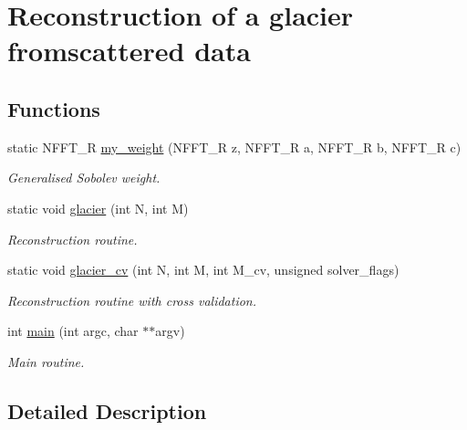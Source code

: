 \hypertarget{group__examples__solver__glacier}{\section{Reconstruction of a glacier fromscattered data}
\label{group__examples__solver__glacier}
}
\subsection*{Functions}
\begin{DoxyCompactItemize}
\item 
\hypertarget{group__examples__solver__glacier_ga9d2aeed180220c8c5c3c53b557c349f7}{static N\-F\-F\-T\-\_\-\-R \hyperlink{group__examples__solver__glacier_ga9d2aeed180220c8c5c3c53b557c349f7}{my\-\_\-weight} (N\-F\-F\-T\-\_\-\-R z, N\-F\-F\-T\-\_\-\-R a, N\-F\-F\-T\-\_\-\-R b, N\-F\-F\-T\-\_\-\-R c)}\label{group__examples__solver__glacier_ga9d2aeed180220c8c5c3c53b557c349f7}

\begin{DoxyCompactList}\small\item\em Generalised Sobolev weight. \end{DoxyCompactList}\item 
\hypertarget{group__examples__solver__glacier_gae32b7b49ac3d92c70301b2f96ab31e7a}{static void \hyperlink{group__examples__solver__glacier_gae32b7b49ac3d92c70301b2f96ab31e7a}{glacier} (int N, int M)}\label{group__examples__solver__glacier_gae32b7b49ac3d92c70301b2f96ab31e7a}

\begin{DoxyCompactList}\small\item\em Reconstruction routine. \end{DoxyCompactList}\item 
\hypertarget{group__examples__solver__glacier_ga1503d05480f3e910ffae52b2e6aef34f}{static void \hyperlink{group__examples__solver__glacier_ga1503d05480f3e910ffae52b2e6aef34f}{glacier\-\_\-cv} (int N, int M, int M\-\_\-cv, unsigned solver\-\_\-flags)}\label{group__examples__solver__glacier_ga1503d05480f3e910ffae52b2e6aef34f}

\begin{DoxyCompactList}\small\item\em Reconstruction routine with cross validation. \end{DoxyCompactList}\item 
\hypertarget{group__examples__solver__glacier_ga3c04138a5bfe5d72780bb7e82a18e627}{int \hyperlink{group__examples__solver__glacier_ga3c04138a5bfe5d72780bb7e82a18e627}{main} (int argc, char $\ast$$\ast$argv)}\label{group__examples__solver__glacier_ga3c04138a5bfe5d72780bb7e82a18e627}

\begin{DoxyCompactList}\small\item\em Main routine. \end{DoxyCompactList}\end{DoxyCompactItemize}


\subsection{Detailed Description}
